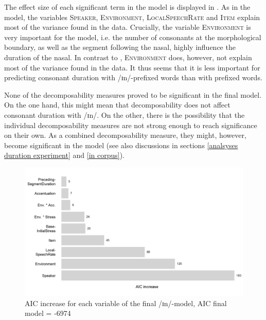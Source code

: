 
The effect size of each significant term in the model is displayed in . As in the model, the variables \textsc{Speaker}, \textsc{Environment}, \textsc{LocalSpeechRate} and \textsc{Item} explain most of the variance found in the data. Crucially, the variable \textsc{Environment} is very important for the model, i.e. the number of consonants at the morphological boundary, as well as the segment following the nasal, highly influence the duration of the nasal. In contrast to , \textsc{Environment} does, however, not explain most of the variance found in the data. It thus seems that it is less important for predicting consonant duration with /ɪn/-prefixed words than with prefixed words. 






None of the decomposability measures proved to be significant in the final model. On the one hand, this might mean that decomposability does not affect consonant duration with /ɪn/. On the other, there is the possibility that the individual decomposability measures are not strong enough to reach significance on their own. As a combined decomposability measure, they might, however, become significant in the model (see also discussions in sections \ref{analsyses duration experiment} and \ref {in corpus}).

\clearpage



\begin{figure}[t!]
	\centering
	\includegraphics[scale=0.7]{images/Experiment/AICdecreaseInComplex.png}
	
	\caption{AIC increase for each variable of the final /ɪn/-model, AIC final model = -6974}
	\label{fig:Effect sizes InComplex Exp}
	
\end{figure}


